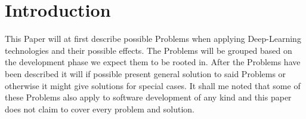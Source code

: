\section{Introduction}

This Paper will at first describe possible Problems when applying Deep-Learning technologies and their possible effects. The Problems will be grouped based on the development phase we expect them to be rooted in. After the Problems have been described it will if possible present general solution to said Problems or otherwise it might give solutions for special cases. It shall me noted that some of these Problems also apply to software development of any kind and this paper does not claim to cover every problem and solution.